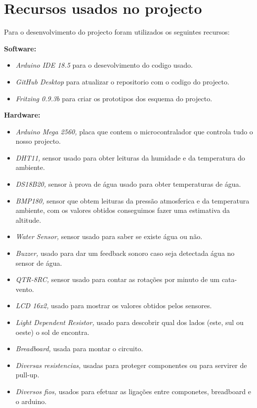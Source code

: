 \documentclass[11pt]{report}
\begin{document}
\chapter*{Recursos usados no projecto}

Para o desenvolvimento do projecto foram utilizados os seguintes recursos:

\textbf{Software:}
\begin{itemize}
\item \textit{Arduino IDE 18.5} para o desevolvimento do codigo usado.
\item \textit{GitHub Desktop} para atualizar o repositorio com o codigo do projecto.
\item \textit{Fritzing 0.9.3b} para criar os prototipos dos esquema do projecto.

\end{itemize}

\textbf{Hardware:}
\begin{itemize}
\item \textit{Arduino Mega 2560,} placa que contem o microcontralador que controla tudo o nosso projecto.
\item \textit{DHT11,} sensor usado para obter leituras da humidade e da temperatura do ambiente.
\item \textit{DS18B20,} sensor à prova de água usado para obter temperaturas de água.
\item \textit{BMP180,} sensor que obtem leituras da pressão atmosferica e da temperatura ambiente, com os valores obtidos conseguimos fazer uma estimativa da altitude.
\item \textit{Water Sensor,} sensor usado para saber se existe água ou não.
\item \textit{Buzzer,} usado para dar um feedback sonoro caso seja detectada água no sensor de água.
\item \textit{QTR-8RC,} sensor usado para contar as rotações por minuto de um cata-vento.
\item \textit{LCD 16x2,} usado para mostrar os valores obtidos pelos sensores.
\item \textit{Light Dependent Resistor,} usado para descobrir qual dos lados (este, sul ou oeste) o sol de encontra.
\item \textit{Breadboard,} usada para montar o circuito.
\item \textit{Diversas resistencias,} usadas para proteger componentes ou para servirer de pull-up.
\item \textit{Diversos fios,} usados para efetuar as ligações entre componetes, breadboard e o arduino.

\end{itemize}
\end{document}
